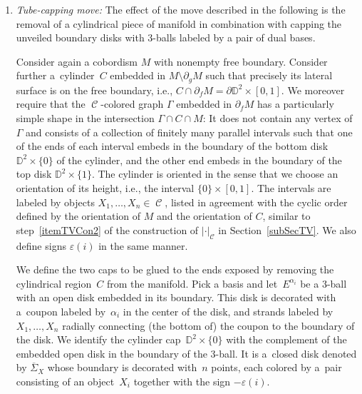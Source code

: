 \documentclass[10pt,a4paper]{amsart}
\DeclareMathOperator{\Hom}{Hom}
\DeclareMathOperator{\calc}{\mathcal{C}}
\numberwithin{equation}{section}
\theoremstyle{definition}
\begin{document}
\begin{enumerate}
 \begin{align*}
 \adjincludegraphics[valign=c, scale = 0.72]{images/tunnelPre.pdf} \, \xrightarrow{\Delta_2^X(\iota)} \, \adjincludegraphics[valign=c, scale = 0.72]{images/tunnelPost.pdf}.
 \end{align*}
 The reason why we explicitly keep the embedding notationally is that for different embeddings $\iota, \iota'\colon C \hookrightarrow M$, the cobordisms $\Delta_2^X(\iota)(M)$ and $\Delta_2^X(\iota')(M)$ need not be equivalent.
 \item \textit{Tube-capping move:} The effect of the move described in the following is the removal of a cylindrical piece of manifold in combination with capping the unveiled boundary disks with 3-balls labeled by a pair of dual bases.

 Consider again a cobordism $M$ with nonempty free boundary. Consider further a~cylinder~$C$ embedded in $M\setminus\partial_gM$ such that precisely its lateral surface is on the free boundary, i.e., $C \cap \partial_f M = \partial \mathbb{D}^2 \times [0,1]$. We moreover require that the $\calc$-colored graph $\Gamma$ embedded in $\partial_f M$ has a particularly simple shape in the intersection $\Gamma \cap C \cap M$: It does not contain any vertex of $\Gamma$ and consists of a collection of finitely many parallel intervals such that one of the ends of each interval embeds in the boundary of the bottom disk $\mathbb{D}^2 \times \{0\}$ of the cylinder, and the other end embeds in the boundary of the top disk $\mathbb{D}^2 \times \{1\}$. The cylinder is oriented in the sense that we choose an orientation of its height, i.e., the interval $\{0\} \times [0,1]$. The intervals are labeled by objects $X_1, \dots, X_n \in \calc$, listed in agreement with the cyclic order defined by the orientation of $M$ and the orientation of $C$, similar to step~\ref{itemTVCon2} of the construction of $|\cdot|_{\calc}$ in Section~\ref{subSecTV}. We also define signs $\varepsilon(i)$ in the same manner.

 We define the two caps to be glued to the ends exposed by removing the cylindrical region~$C$ from the manifold. Pick a basis \smash{$\{\alpha_i\} \subset \Hom_{\mathcal{C}}\bigl(X_1^{\varepsilon(1)} \otimes \dots \otimes X_n^{\varepsilon(n)}, \mathbbm{1}\bigr)$} and let~$E^{\alpha_i}$ be a 3-ball with an open disk embedded in its boundary. This disk is decorated with a~coupon labeled by~$\alpha_i$ in the center of the disk, and strands labeled by~$X_1, \dots, X_n$ radially connecting (the bottom of) the coupon to the boundary of the disk. We identify the cylinder cap~$\mathbb{D}^2 \times \{0\}$ with the complement of the embedded open disk in the boundary of the 3-ball. It is a~closed disk denoted by $\overline\Sigma_X$ whose boundary is decorated with~$n$ points, each colored by a~pair consisting of an object~$X_i$ together with the sign $-\varepsilon(i)$.


\end{enumerate}
\end{document}
